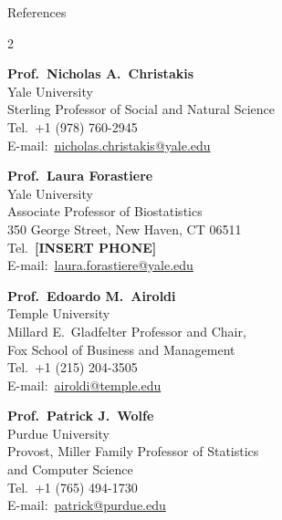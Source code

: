 \documentclass{resume}
\providecommand{\Telefon}{Tel.}
\providecommand{\Letter}{E-mail:}
\begin{document}
\begin{rSection}{References}
\begin{multicols}{2}
\raggedcolumns

\begin{minipage}[t]{\linewidth}
\textbf{Prof.\ Nicholas A.\ Christakis}\\
Yale University\\
Sterling Professor of Social and Natural Science\\
\Telefon\ +1 (978) 760-2945\\
\Letter\ \href{mailto:nicholas.christakis@yale.edu}{nicholas.christakis@yale.edu}
\end{minipage}\par\medskip

\begin{minipage}[t]{\linewidth}
\textbf{Prof.\ Laura Forastiere}\\
Yale University\\
Associate Professor of Biostatistics\\
350 George Street, New Haven, CT 06511\\
\Telefon\ \textbf{[INSERT PHONE]}\\
\Letter\ \href{mailto:laura.forastiere@yale.edu}{laura.forastiere@yale.edu}
\end{minipage}\par\medskip

\begin{minipage}[t]{\linewidth}
\textbf{Prof.\ Edoardo M.\ Airoldi}\\
Temple University\\
Millard E.\ Gladfelter Professor and Chair,\\
Fox School of Business and Management\\
\Telefon\ +1 (215) 204-3505\\
\Letter\ \href{mailto:airoldi@temple.edu}{airoldi@temple.edu}
\end{minipage}\par\medskip

\begin{minipage}[t]{\linewidth}
\textbf{Prof.\ Patrick J.\ Wolfe}\\
Purdue University\\
Provost, Miller Family Professor of Statistics\\
and Computer Science\\
\Telefon\ +1 (765) 494-1730\\
\Letter\ \href{mailto:patrick@purdue.edu}{patrick@purdue.edu}
\end{minipage}\par\medskip


\end{multicols}
\end{rSection}
\end{document}
